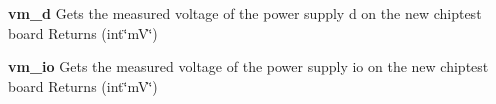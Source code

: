 \begin{DoxyItemize}
\item {\bfseries vm\_\-d} Gets the measured voltage of the power supply d on the new chiptest board {\ttfamily Returns} {\ttfamily }(int\char`\"{}mV\char`\"{})
\end{DoxyItemize}


\begin{DoxyItemize}
\item {\bfseries vm\_\-io} Gets the measured voltage of the power supply io on the new chiptest board {\ttfamily Returns} {\ttfamily }(int\char`\"{}mV\char`\"{}) 
\end{DoxyItemize}